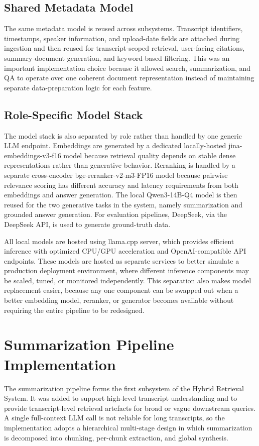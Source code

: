 \subsection{Shared Metadata Model}
The same metadata model is reused across subsystems. Transcript identifiers, timestamps, speaker information, and upload-date fields are attached during ingestion and then reused for transcript-scoped retrieval, user-facing citations, summary-document generation, and keyword-based filtering. This was an important implementation choice because it allowed search, summarization, and QA to operate over one coherent document representation instead of maintaining separate data-preparation logic for each feature.

\subsection{Role-Specific Model Stack}
The model stack is also separated by role rather than handled by one generic LLM endpoint. Embeddings are generated by a dedicated locally-hosted jina-embeddings-v3-f16 model because retrieval quality depends on stable dense representations rather than generative behavior. Reranking is handled by a separate cross-encoder bge-reranker-v2-m3-FP16 model because pairwise relevance scoring has different accuracy and latency requirements from both embeddings and answer generation. The local Qwen3-14B-Q4 model is then reused for the two generative tasks in the system, namely summarization and grounded answer generation. For evaluation pipelines, DeepSeek, via the DeepSeek API, is used to generate ground-truth data. 

All local models are hosted using llama.cpp server, which provides efficient inference with optimized CPU/GPU acceleration and OpenAI-compatible API endpoints.\cite{jina_embeddings_v3,bge_reranker_v2_m3,qwen3_14b_base,deepseek_api_docs,llama_cpp_server} These models are hosted as separate services to better simulate a production deployment environment, where different inference components may be scaled, tuned, or monitored independently. This separation also makes model replacement easier, because any one component can be swapped out when a better embedding model, reranker, or generator becomes available without requiring the entire pipeline to be redesigned.

\section{Summarization Pipeline Implementation}
The summarization pipeline forms the first subsystem of the Hybrid Retrieval System. It was added to support high-level transcript understanding and to provide transcript-level retrieval artefacts for broad or vague downstream queries. A single full-context LLM call is not reliable for long transcripts, so the implementation adopts a hierarchical multi-stage design in which summarization is decomposed into chunking, per-chunk extraction, and global synthesis.

